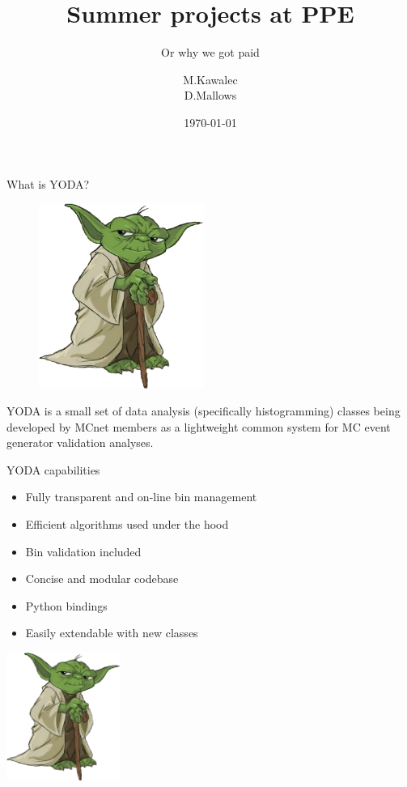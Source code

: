 \documentclass{beamer}
\title{Summer projects at PPE}
\subtitle{Or why we got paid}
\author{M.Kawalec \\ D.Mallows}
\date{\today}
\begin{document}
  \frame{\titlepage}


  
  \begin{frame}{What is YODA?}
  \begin{figure}
  \begin{center}
    \includegraphics[width=0.48\textwidth]{yoda-logo}
  \end{center}
  \end{figure}
  YODA is a small set of data analysis (specifically histogramming) classes being developed by MCnet members as a lightweight common system for MC event generator validation analyses. 
  \end{frame}

  \begin{frame}{YODA capabilities}
    \begin{itemize}[<uncover@+>]
      \item Fully transparent and on-line bin management
      \item Efficient algorithms used under the hood
      \item Bin validation included
      \item Concise and modular codebase
      \item Python bindings 
      \item Easily extendable with new classes
    \end{itemize}
    \includegraphics[width=0.28\textwidth]{yoda-logo}
  \end{frame}
\end{document}
